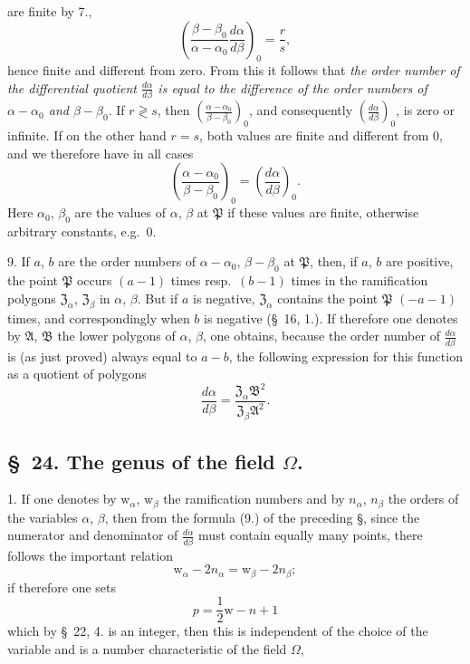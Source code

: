\documentclass{article}
\begin{document}
are finite by 7.,
\[ \left(\frac{\beta-\beta_{0}}{\alpha-\alpha_{0}}\frac{d\alpha}{d\beta}\right)_{0} = \frac{r}{s}, \tag{7.} \]
hence finite and different from zero. From this it follows that \emph{the order number of the differential quotient $\frac{d\alpha}{d\beta}$ is equal to the difference of the order numbers of $\alpha-\alpha_{0}$ and $\beta-\beta_{0}$}. If $r \gtrless s$, then $\left(\frac{\alpha-\alpha_{0}}{\beta-\beta_{0}}\right)_{0}$, and consequently $\left(\frac{d\alpha}{d\beta}\right)_{0}$, is zero or infinite. If on the other hand $r = s$, both values are finite and different from 0, and we therefore have in all cases
\[ \left(\frac{\alpha-\alpha_{0}}{\beta-\beta_{0}}\right)_{0} = \left(\frac{d\alpha}{d\beta}\right)_{0}. \tag{8.} \]
Here $\alpha_{0}$, $\beta_{0}$ are the values of $\alpha$, $\beta$ at $\mathfrak{P}$ if these values are finite, otherwise arbitrary constants, e.g.\ 0.

9. If $a$, $b$ are the order numbers of $\alpha-\alpha_{0}$, $\beta-\beta_{0}$ at $\mathfrak{P}$, then, if $a$, $b$ are positive, the point $\mathfrak{P}$ occurs $(a-1)$ times resp.\ $(b-1)$ times in the ramification polygons $\mathfrak{Z}_{\alpha}$, $\mathfrak{Z}_{\beta}$ in $\alpha$, $\beta$. But if $a$ is negative, $\mathfrak{Z}_{\alpha}$ contains the point $\mathfrak{P}$ $(-a-1)$ times, and correspondingly when $b$ is negative (§~16, 1.). If therefore one denotes by $\mathfrak{A}$, $\mathfrak{B}$ the lower polygons of $\alpha$, $\beta$, one obtains, because the order number of $\frac{d\alpha}{d\beta}$ is (as just proved) always equal to $a-b$, the following expression for this function as a quotient of polygons
\[ \frac{d\alpha}{d\beta} = \frac{\mathfrak{Z}_{\alpha}\mathfrak{B}^{2}}{\mathfrak{Z}_{\beta}\mathfrak{A}^{2}}. \tag{9.} \]

\subsection*{§~24. The genus of the field $\Omega$.}

1. If one denotes by $\mathrm{w}_{\alpha}$, $\mathrm{w}_{\beta}$ the ramification numbers and by $n_{\alpha}$, $n_{\beta}$ the orders of the variables $\alpha$, $\beta$, then from the formula (9.) of the preceding §, since the numerator and denominator of $\frac{d\alpha}{d\beta}$ must contain equally many points, there follows the important relation
\[ \mathrm{w}_{\alpha} - 2n_{\alpha} = \mathrm{w}_{\beta} - 2n_{\beta}; \]
if therefore one sets
\[ p = \frac{1}{2}\mathrm{w} - n + 1 \tag{1.} \]
which by §~22, 4. is an integer, then this is independent of the choice of the variable and is a number characteristic of the field $\Omega$,
\end{document}
